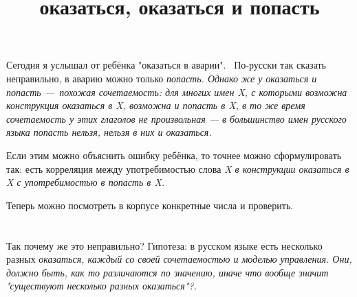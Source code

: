 \title{оказаться, оказаться и попасть}

\section{}
Сегодня я услышал от ребёнка "оказаться в аварии".
 По-русски так сказать неправильно, в аварию можно только \em{попасть}.
Однако же у \em{оказаться} и \em{попасть} — похожая сочетаемость: для многих имен \em{X}, с которыми возможна конструкция \em{оказаться в X}, возможна и \em{попасть в X}, в то же время сочетаемость у этих глаголов не произвольная — в большинство имен русского языка \em{попасть} нельзя, нельзя в них и \em{оказаться}.

Если этим можно объяснить ошибку ребёнка, то точнее можно сформулировать так: есть корреляция между употребимостью слова \em{X} в конструкции \em{оказаться в X} с употребимостью в \em{попасть в X}.

Теперь можно посмотреть в корпусе конкретные числа и проверить.
\section{}
Так почему же это неправильно?
Гипотеза: в русском языке есть несколько разных \em{оказаться}, каждый со своей сочетаемостью и моделью управления. Они, должно быть, как то различаются по значению, иначе что вообще значит "существуют несколько разных оказаться"?.

